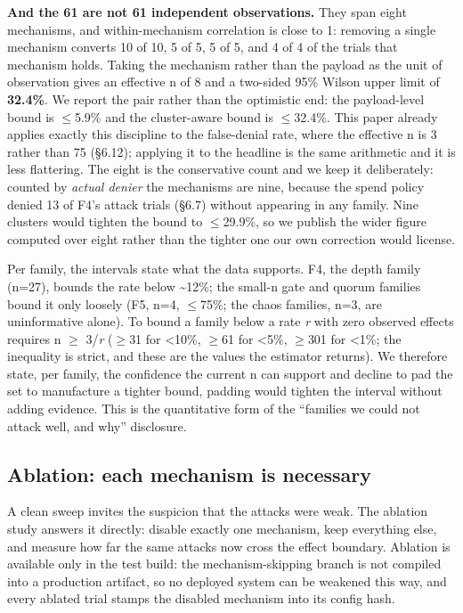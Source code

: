\documentclass[11pt]{article}
\begin{document}
\textbf{And the 61 are not 61 independent observations.} They span eight mechanisms, and
within-mechanism correlation is close to 1: removing a single mechanism converts 10 of 10, 5 of 5,
5 of 5, and 4 of 4 of the trials that mechanism holds. Taking the mechanism rather than the payload
as the unit of observation gives an effective n of 8 and a two-sided 95\% Wilson upper limit of
\textbf{32.4\%}. We report the pair rather than the optimistic end: the payload-level bound is
$\leq$5.9\% and the cluster-aware bound is $\leq$32.4\%. This paper already applies exactly this
discipline to the false-denial rate, where the effective n is 3 rather than 75 (\S6.12); applying
it to the headline is the same arithmetic and it is less flattering. The eight is the conservative
count and we keep it deliberately: counted by \emph{actual denier} the mechanisms are nine, because
the spend policy denied 13 of F4's attack trials (\S6.7) without appearing in any family. Nine
clusters would tighten the bound to $\leq$29.9\%, so we publish the wider figure computed over
eight rather than the tighter one our own correction would license.

Per family, the intervals state what the data supports. F4, the depth
family (n=27), bounds the rate below \textasciitilde12\%; the small-n gate and quorum families bound it only
loosely (F5, n=4, $\leq$75\%; the chaos families, n=3, are uninformative alone). To bound a family
below a rate \emph{r} with zero observed effects requires n $\geq$ 3/\emph{r} ($\geq$31 for \textless10\%, $\geq$61 for \textless5\%,
$\geq$301 for \textless1\%; the inequality is strict, and these are the values the estimator returns). We therefore state, per family, the confidence the current n can support and
decline to pad the set to manufacture a tighter bound, padding would tighten the interval without adding evidence. This is the quantitative form of the ``families we could not attack well,
and why'' disclosure.

\subsection{Ablation: each mechanism is necessary}\label{ablation-each-mechanism-is-necessary}

A clean sweep invites the suspicion that the attacks were weak. The ablation study answers it
directly: disable exactly one mechanism, keep everything else, and measure how far the same
attacks now cross the effect boundary. Ablation is available only in the test build: the
mechanism-skipping branch is not compiled into a production artifact, so no deployed system
can be weakened this way, and every ablated trial stamps the disabled mechanism into its
config hash.
\end{document}

